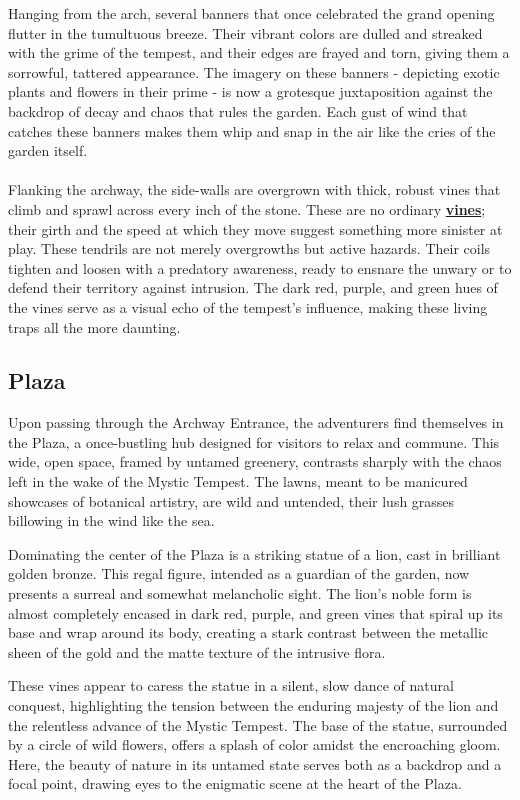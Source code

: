 Hanging from the arch, several banners that once celebrated the grand opening flutter in the tumultuous breeze. Their vibrant colors are dulled and streaked with the grime of the tempest, and their edges are frayed and torn, giving them a sorrowful, tattered appearance. The imagery on these banners - depicting exotic plants and flowers in their prime - is now a grotesque juxtaposition against the backdrop of decay and chaos that rules the garden. Each gust of wind that catches these banners makes them whip and snap in the air like the cries of the garden itself.\\\hfill\\

Flanking the archway, the side-walls are overgrown with thick, robust vines that climb and sprawl across every inch of the stone. These are no ordinary \hyperref[sec:VineTrap]{\textbf{vines}}; their girth and the speed at which they move suggest something more sinister at play. These tendrils are not merely overgrowths but active hazards. Their coils tighten and loosen with a predatory awareness, ready to ensnare the unwary or to defend their territory against intrusion. The dark red, purple, and green hues of the vines serve as a visual echo of the tempest's influence, making these living traps all the more daunting.
\subsection*{Plaza}
Upon passing through the Archway Entrance, the adventurers find themselves in the Plaza, a once-bustling hub designed for visitors to relax and commune. This wide, open space, framed by untamed greenery, contrasts sharply with the chaos left in the wake of the Mystic Tempest. The lawns, meant to be manicured showcases of botanical artistry, are wild and untended, their lush grasses billowing in the wind like the sea.

Dominating the center of the Plaza is a striking statue of a lion, cast in brilliant golden bronze. This regal figure, intended as a guardian of the garden, now presents a surreal and somewhat melancholic sight. The lion's noble form is almost completely encased in dark red, purple, and green vines that spiral up its base and wrap around its body, creating a stark contrast between the metallic sheen of the gold and the matte texture of the intrusive flora.

These vines appear to caress the statue in a silent, slow dance of natural conquest, highlighting the tension between the enduring majesty of the lion and the relentless advance of the Mystic Tempest. The base of the statue, surrounded by a circle of wild flowers, offers a splash of color amidst the encroaching gloom. Here, the beauty of nature in its untamed state serves both as a backdrop and a focal point, drawing eyes to the enigmatic scene at the heart of the Plaza.
